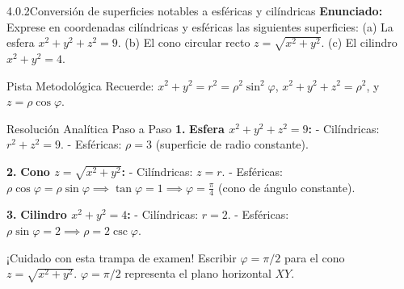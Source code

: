 \documentclass[11pt,a4paper]{article}
\begin{document}
\begin{nivelbox}{4.0.2}{Conversión de superficies notables a esféricas y cilíndricas}
\textbf{Enunciado:}\\
Exprese en coordenadas cilíndricas y esféricas las siguientes superficies:
(a) La esfera $x^2 + y^2 + z^2 = 9$.
(b) El cono circular recto $z = \sqrt{x^2 + y^2}$.
(c) El cilindro $x^2 + y^2 = 4$.

\begin{observacionbox}{Pista Metodológica}
Recuerde: $x^2+y^2 = r^2 = \rho^2\sin^2\varphi$, $x^2+y^2+z^2 = \rho^2$, y $z = \rho\cos\varphi$.
\end{observacionbox}

\begin{ejerciciobox}{Resolución Analítica Paso a Paso}
\smallskip\noindent\textbf{1.} \textbf{Esfera $x^2+y^2+z^2 = 9$:}
- Cilíndricas: $r^2 + z^2 = 9$.
- Esféricas: $\rho = 3$ (superficie de radio constante).

\smallskip\noindent\textbf{2.} \textbf{Cono $z = \sqrt{x^2+y^2}$:}
- Cilíndricas: $z = r$.
- Esféricas: $\rho\cos\varphi = \rho\sin\varphi \implies \tan\varphi = 1 \implies \varphi = \frac{\pi}{4}$ (cono de ángulo constante).

\smallskip\noindent\textbf{3.} \textbf{Cilindro $x^2+y^2 = 4$:}
- Cilíndricas: $r = 2$.
- Esféricas: $\rho\sin\varphi = 2 \implies \rho = 2\csc\varphi$.
\end{ejerciciobox}

\begin{errorbox}{¡Cuidado con esta trampa de examen!}
Escribir $\varphi = \pi/2$ para el cono $z = \sqrt{x^2+y^2}$. $\varphi = \pi/2$ representa el plano horizontal $XY$.
\end{errorbox}
\end{nivelbox}
\bigskip
\end{document}
